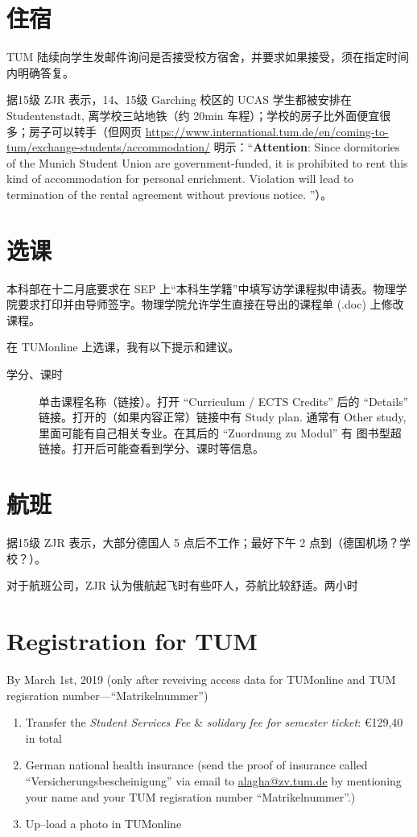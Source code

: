 \documentclass[final]{book}
\begin{document}
\chapter{住宿}
TUM 陆续向学生发邮件询问是否接受校方宿舍，并要求如果接受，须在指定时间内明确答复。

据15级 ZJR 表示，14、15级 Garching 校区的 UCAS 学生都被安排在 Studentenstadt, 离学校三站地铁（约 20min 车程）；学校的房子比外面便宜很多；房子可以转手（但网页 \url{https://www.international.tum.de/en/coming-to-tum/exchange-students/accommodation/} 明示：``\textbf{Attention}: Since dormitories of the Munich Student Union are government-funded, it is prohibited to rent this kind of accommodation for personal enrichment. Violation will lead to termination of the rental agreement without previous notice. ''）。

\chapter{选课}
本科部在十二月底要求在 SEP 上“本科生学籍”中填写访学课程拟申请表。物理学院要求打印并由导师签字。物理学院允许学生直接在导出的课程单 (.doc) 上修改课程。

在 TUMonline 上选课，我有以下提示和建议。
\begin{description}
\item[学分、课时] 单击课程名称（链接）。打开 ``Curriculum /
ECTS Credits'' 后的 ``Details'' 链接。打开的（如果内容正常）链接中有 Study plan. 通常有 Other study, 里面可能有自己相关专业。在其后的 ``Zuordnung zu Modul'' 有
图书型超链接。打开后可能查看到学分、课时等信息。
\end{description}

\chapter{航班}
据15级 ZJR 表示，大部分德国人 5 点后不工作；最好下午 2 点到（德国机场？学校？）。

对于航班公司，ZJR 认为俄航起飞时有些吓人，芬航比较舒适。两小时

\chapter{Registration for TUM}
By March 1st, 2019 (only after reveiving access data for TUMonline and TUM regisration number---``Matrikelnummer'')
\begin{enumerate}
\item Transfer the \emph{Student Services Fee} \& \emph{solidary fee for semester ticket}: \euro{129,40} in total
\item German national health insurance (send the proof of insurance called ``Versicherungsbescheinigung'' via email to \href{mailto:alagha@zv.tum.de}{alagha@zv.tum.de} by mentioning your name and your TUM regisration number ``Matrikelnummer''.)
\item Up--load a photo in TUMonline
\end{enumerate}
\end{document}
